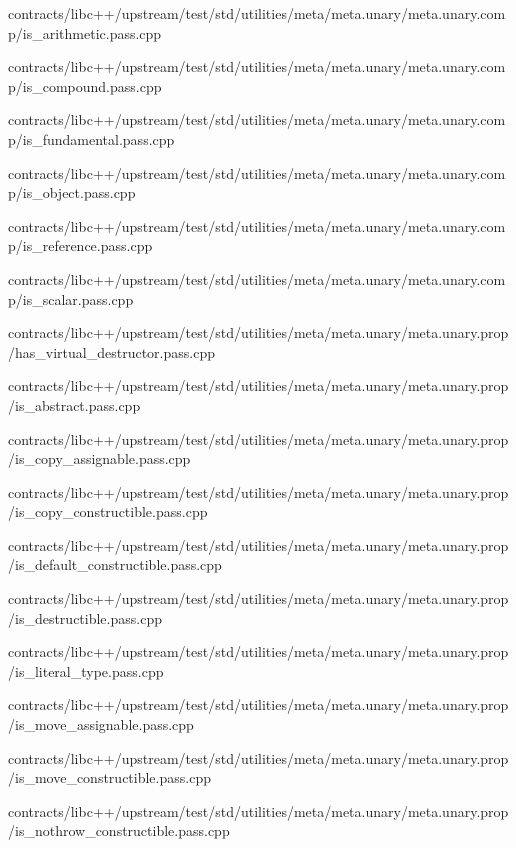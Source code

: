 \begin{DoxyCompactItemize}
contracts/libc++/upstream/test/std/utilities/meta/meta.\+unary/meta.\+unary.\+comp/is\+\_\+arithmetic.\+pass.\+cpp\item 
contracts/libc++/upstream/test/std/utilities/meta/meta.\+unary/meta.\+unary.\+comp/is\+\_\+compound.\+pass.\+cpp\item 
contracts/libc++/upstream/test/std/utilities/meta/meta.\+unary/meta.\+unary.\+comp/is\+\_\+fundamental.\+pass.\+cpp\item 
contracts/libc++/upstream/test/std/utilities/meta/meta.\+unary/meta.\+unary.\+comp/is\+\_\+object.\+pass.\+cpp\item 
contracts/libc++/upstream/test/std/utilities/meta/meta.\+unary/meta.\+unary.\+comp/is\+\_\+reference.\+pass.\+cpp\item 
contracts/libc++/upstream/test/std/utilities/meta/meta.\+unary/meta.\+unary.\+comp/is\+\_\+scalar.\+pass.\+cpp\item 
contracts/libc++/upstream/test/std/utilities/meta/meta.\+unary/meta.\+unary.\+prop/has\+\_\+virtual\+\_\+destructor.\+pass.\+cpp\item 
contracts/libc++/upstream/test/std/utilities/meta/meta.\+unary/meta.\+unary.\+prop/is\+\_\+abstract.\+pass.\+cpp\item 
contracts/libc++/upstream/test/std/utilities/meta/meta.\+unary/meta.\+unary.\+prop/is\+\_\+copy\+\_\+assignable.\+pass.\+cpp\item 
contracts/libc++/upstream/test/std/utilities/meta/meta.\+unary/meta.\+unary.\+prop/is\+\_\+copy\+\_\+constructible.\+pass.\+cpp\item 
contracts/libc++/upstream/test/std/utilities/meta/meta.\+unary/meta.\+unary.\+prop/is\+\_\+default\+\_\+constructible.\+pass.\+cpp\item 
contracts/libc++/upstream/test/std/utilities/meta/meta.\+unary/meta.\+unary.\+prop/is\+\_\+destructible.\+pass.\+cpp\item 
contracts/libc++/upstream/test/std/utilities/meta/meta.\+unary/meta.\+unary.\+prop/is\+\_\+literal\+\_\+type.\+pass.\+cpp\item 
contracts/libc++/upstream/test/std/utilities/meta/meta.\+unary/meta.\+unary.\+prop/is\+\_\+move\+\_\+assignable.\+pass.\+cpp\item 
contracts/libc++/upstream/test/std/utilities/meta/meta.\+unary/meta.\+unary.\+prop/is\+\_\+move\+\_\+constructible.\+pass.\+cpp\item 
contracts/libc++/upstream/test/std/utilities/meta/meta.\+unary/meta.\+unary.\+prop/is\+\_\+nothrow\+\_\+constructible.\+pass.\+cpp\item 

\end{DoxyCompactItemize}
